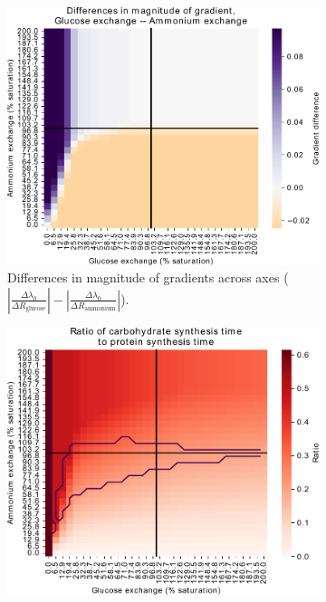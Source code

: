 \begin{figure}
\begin{subfigure}[t]{0.45\textwidth}
{    }
    \label{fig:model-grid-glc-growthrate}
  \end{subfigure}
  \begin{subfigure}[t]{0.45\textwidth}
  \centering
    \includegraphics[width=\linewidth]{ec_grid_glc_amm_gradient_compare}
    \caption{
      Differences in magnitude of gradients across axes ($|\frac{\Delta \lambda_{0}}{\Delta R_{\mathrm{glucose}}}| - |\frac{\Delta \lambda_{0}}{\Delta R_{\mathrm{ammonium}}}|$).
    }
    \label{fig:model-grid-glc-gradient-compare}
  \end{subfigure}%
  \begin{subfigure}[t]{0.45\textwidth}
  \centering
    \includegraphics[width=\linewidth]{ec_grid_glc_amm_carb_to_prot}

\end{subfigure}
\end{figure}

